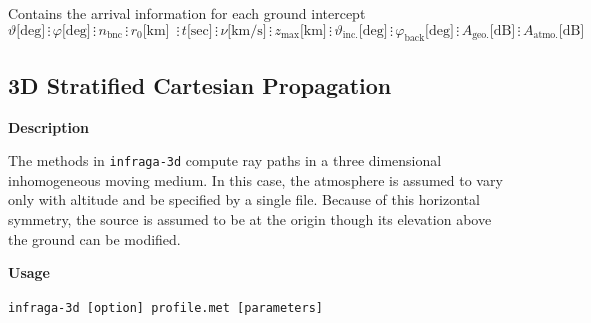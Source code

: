 \documentclass[10pt]{article}
\begin{document}
	Contains the arrival information for each ground intercept
	\begin{equation*}
	\vartheta \text{[deg]} \hspace{2pt} \vdots \hspace{2pt} 
	\varphi \text{[deg]} \hspace{2pt} \vdots \hspace{2pt} 
	n_\text{bnc} \hspace{2pt} \vdots \hspace{2pt}
	r_0 \text{[km] } \hspace{2pt} \vdots \hspace{2pt}  
	t \text{[sec]} \hspace{2pt} \vdots \hspace{2pt} 
	\nu \text{[km/s]} \hspace{2pt} \vdots \hspace{2pt} 
	z_\text{max} \text{[km]} \hspace{2pt} \vdots \hspace{2pt} 
	\vartheta_\text{inc.} \text{[deg]} \hspace{2pt} \vdots \hspace{2pt}
	\varphi_\text{back} \text{[deg]} \hspace{2pt} \vdots \hspace{2pt}
	A_\text{geo.} \text{[dB]} \hspace{2pt} \vdots \hspace{2pt}
	A_\text{atmo.} \text{[dB]}	
	\end{equation*}

\subsection{3D Stratified Cartesian Propagation}
\label{Sect:Usage:3D}
\textbf{Description}  

The methods in \verb=infraga-3d= compute ray paths in a three dimensional inhomogeneous moving medium.  In this case, the atmosphere is assumed to vary only with altitude and be specified by a single file.  Because of this horizontal symmetry, the source is assumed to be at the origin though its elevation above the ground can be modified.

\vspace{0.02\textheight}

 \hspace{-0.25in}\textbf{Usage} 

\begin{center} \begin{large}
\verb=infraga-3d [option] profile.met [parameters] =
\end{large} \end{center}
\end{document}
